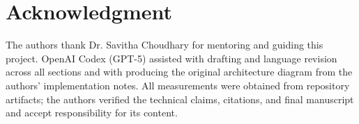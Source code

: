 \documentclass[letterpaper,conference]{IEEEtran}
\begin{document}
\section*{Acknowledgment}
The authors thank Dr. Savitha Choudhary for mentoring and guiding this project. OpenAI Codex (GPT-5) assisted with drafting and language revision across all sections and with producing the original architecture diagram from the authors' implementation notes. All measurements were obtained from repository artifacts; the authors verified the technical claims, citations, and final manuscript and accept responsibility for its content.



\end{document}
